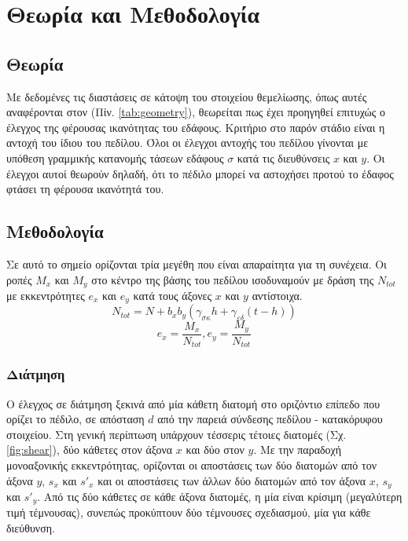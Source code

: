 \pagestyle{fancy}
\chapter{Θεωρία και Μεθοδολογία}
\section{Θεωρία}
Με δεδομένες τις διαστάσεις σε κάτοψη του στοιχείου θεμελίωσης, όπως αυτές αναφέρονται στον (Πίν. \ref{tab:geometry}), θεωρείται πως έχει προηγηθεί επιτυχώς ο έλεγχος της φέρουσας ικανότητας του εδάφους. Κριτήριο στο παρόν στάδιο είναι η αντοχή του ίδιου του πεδίλου. Όλοι οι έλεγχοι αντοχής του πεδίλου γίνονται με υπόθεση γραμμικής κατανομής τάσεων εδάφους ${\sigma}$ κατά τις διευθύνσεις $x$ και $y$. Οι έλεγχοι αυτοί θεωρούν δηλαδή, ότι το πέδιλο μπορεί να αστοχήσει προτού το έδαφος φτάσει τη φέρουσα ικανότητά του.

\section{Μεθοδολογία}
Σε αυτό το σημείο ορίζονται τρία μεγέθη που είναι απαραίτητα για τη συνέχεια. Οι ροπές $M_{x}$ και $M_{y}$ στο κέντρο της βάσης του πεδίλου ισοδυναμούν με δράση της $N_{tot}$ με εκκεντρότητες $e_{x}$ και $e_{y}$ κατά τους άξονες $x$ και $y$ αντίστοιχα.
\begin{equation}
  N_{tot} = N + b_x b_y ({\gamma}_{\sigma\kappa} h + {\gamma}_{\varepsilon\delta}(t - h))\label{eqn:21}
\end{equation}
\begin{equation}
  e_{x} = \dfrac{M_{x}}{N_{tot}}, e_{y} = \dfrac{M_{y}}{N_{tot}}\label{eqn:22}
\end{equation}
\subsection{Διάτμηση}
Ο έλεγχος σε διάτμηση ξεκινά από μία κάθετη διατομή στο οριζόντιο επίπεδο που ορίζει το πέδιλο, σε απόσταση $d$ από την παρειά σύνδεσης πεδίλου - κατακόρυφου στοιχείου. Στη γενική περίπτωση υπάρχουν τέσσερις τέτοιες διατομές (Σχ. \ref{fig:shear}), δύο κάθετες στον άξονα $x$ και δύο στον $y$. Με την παραδοχή μονοαξονικής εκκεντρότητας, ορίζονται οι αποστάσεις των δύο διατομών από τον άξονα $y$, $s_x$ και $s'_x$ και οι αποστάσεις των άλλων δύο διατομών από τον άξονα $x$, $s_y$ και $s'_y$. Από τις δύο κάθετες σε κάθε άξονα διατομές, η μία είναι κρίσιμη (μεγαλύτερη τιμή τέμνουσας), συνεπώς προκύπτουν δύο τέμνουσες σχεδιασμού, μία για κάθε διεύθυνση.

